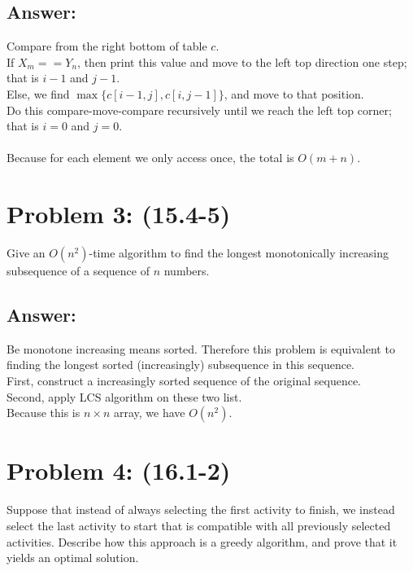 \documentclass[a4paper]{article}
\begin{document}
\subsection*{Answer:}
Compare from the right bottom of table $c$.\\
If $X_m==Y_n$, then print this value and move to the left top direction one step; that is $i-1$ and $j-1$.\\
Else, we find $\max\{c[i-1, j],c[i, j-1]\}$, and move to that position.\\
Do this compare-move-compare recursively until we reach the left top corner; that is $i=0$ and $j=0$.\\
\\
Because for each element we only access once, the total is $O(m+n)$.


\section*{Problem 3: (15.4-5)} Give an $O(n^2)$-time algorithm to find the longest monotonically increasing subsequence of a sequence of $n$ numbers.
\subsection*{Answer:}
Be monotone increasing means sorted. Therefore this problem is equivalent to finding the longest sorted (increasingly) subsequence in this sequence.\\
First, construct a increasingly sorted sequence of the original sequence.\\
Second, apply LCS algorithm on these two list.\\
Because this is $n\times n$ array, we have $O(n^2)$.

\section*{Problem 4: (16.1-2)} Suppose that instead of always selecting the first activity to finish, we instead select the last activity to start that is compatible with all previously selected activities. Describe how this approach is a greedy algorithm, and prove that it yields an optimal solution.
\end{document}
